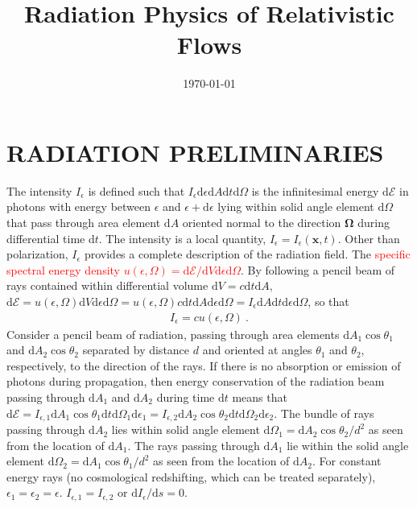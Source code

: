 \documentclass[12pt,a4paper]{article}
\title{Radiation Physics of Relativistic Flows}
\author{}
\date{\today}
\renewcommand{\vec}[1]{\boldsymbol{#1}}
\newcommand{\dif}{\mathrm{d}}
\begin{document}
\maketitle

\section{RADIATION PRELIMINARIES}
\cite{2009herb.book.....D} The intensity $I_\epsilon$ is defined such that $I_\epsilon \dif \epsilon　\dif A \dif t \dif \Omega$ is the infinitesimal energy $\dif \mathcal E$ in photons with energy between $\epsilon$ and $\epsilon　+\dif \epsilon$ lying within solid angle element $\dif \Omega$ that pass through area element $\dif A$ oriented normal to the direction $\vec{\Omega}$ during differential time $\dif t$. The intensity is a local quantity, $I_\epsilon = I_\epsilon(\vec{x}, t)$. Other than polarization, $I_\epsilon$ provides a complete description of the radiation field. The \textcolor{red}{specific spectral energy density $u(\epsilon, \Omega) = \dif \mathcal E/\dif V\dif \epsilon \dif \Omega$}. By following a pencil beam of rays contained within differential volume $\dif V = c\dif t \dif A$, $\dif \mathcal E = u(\epsilon, \Omega) \dif V \dif \epsilon\dif \Omega = u(\epsilon, \Omega)c\dif t \dif A \dif \epsilon\dif \Omega = I_\epsilon\dif A \dif t \dif \epsilon\dif \Omega$, so that
\begin{align}
I_\epsilon = c u(\epsilon, \Omega) ~.
\end{align}
Consider a pencil beam of radiation, passing through area elements $\dif A_1 \cos \theta_1$ and $\dif A_2 \cos \theta_2$ separated by distance $d$ and oriented at angles $\theta_1$ and $\theta_2$, respectively, to the direction of the rays. If there is no absorption or emission of photons during propagation, then energy conservation of the radiation beam passing through $\dif A_1$ and $\dif A_2$ during time $\dif t$ means that $\dif \mathcal E = I_{\epsilon, 1} \dif A_1 \cos \theta_1 \dif t \dif \Omega_1 \dif \epsilon_1 = I_{\epsilon, 2} \dif A_2 \cos \theta_2 \dif t \dif \Omega_2 \dif \epsilon_2$. The bundle of rays passing through $\dif A_2$ lies within solid angle element $\dif \Omega_1  = \dif A_2 \cos \theta_2 /d^2$ as seen from the location of $\dif A_1$. The rays passing through $\dif A_1$ lie within the solid angle element $\dif \Omega_2  = \dif A_1 \cos \theta_1 /d^2$ as seen from the location of $\dif A_2$. For constant energy rays (no cosmological redshifting, which can be treated separately), $\epsilon_1 = \epsilon_2 = \epsilon$. $I_{\epsilon, 1} = I_{\epsilon, 2}$ or $\dif I_{\epsilon}/\dif s = 0$.
\end{document}
